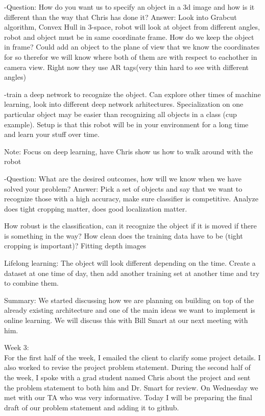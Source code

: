 \documentclass[draftclsnofoot, onecolumn, 10pt, compsoc]{IEEEtran}
\begin{document}
-Question: How do you want us to specify an object in a 3d image and how is it different than the way that Chris has done it? Answer: Look into Grabcut algorithm, Convex Hull in 3-space, robot will look at object from different angles, robot and object must be in same coordinate frame. How do we keep the object in frame? Could add an object to the plane of view that we know the coordinates for so therefor we will know where both of them are with respect to eachother in camera view. Right now they use AR tags(very thin hard to see with different angles)

-train a deep network to recognize the object. Can explore other times of machine learning, look into different deep network arhitectures. Specialization on one particular object may be easier than recognizing all objects in a class (cup example). Setup is that this robot will be in your environment for a long time and learn your stuff over time.
	
Note: Focus on deep learning, have Chris show us how to walk around with the robot
	
-Question: What are the desired outcomes, how will we know when we have solved your problem? Answer: Pick a set of objects and say that we want to recognize those with a high accuracy, make sure classifier is competitive. Analyze does tight cropping matter, does good localization matter.
	
How robust is the classification, can it recognize the object if it is moved if there is something in the way? How clean does the training data have to be (tight cropping is important)? Fitting depth images
	
Lifelong learning: The object will look different depending on the time. Create a dataset at one time of day, then add another training set at another time and try to combine them.

Summary: 
We started discussing how we are planning on building on top of the already existing architecture and one of the main ideas we want to implement is online learning. We will discuss this with Bill Smart at our next meeting with him. 

Week 3:
\\ \indent For the first half of the week, I emailed the client to clarify some project details. I also worked to revise the  project problem statement. During the second half of the week, I spoke with a grad student named Chris about the project and sent the problem statement to both him and Dr. Smart for review. On Wednesday we met with our TA who was very informative. Today I will be preparing the final draft of our problem statement and adding it to github.
\end{document}
